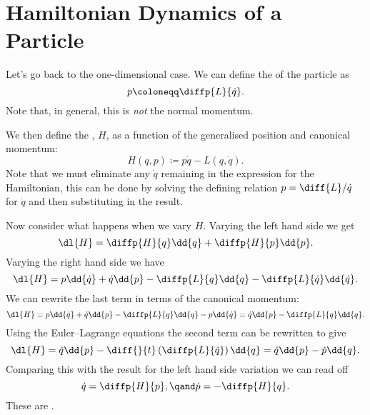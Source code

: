 \documentclass[fleqn]{NotesClass}
\newcommand{\lagrangian}{L}
\begin{document}
    \section{Hamiltonian Dynamics of a Particle}
    Let's go back to the one-dimensional case.
    We can define the  of the particle as
    \begin{equation}
        p \coloneqq \diffp{\lagrangian}{\dot{q}}.
    \end{equation}
    Note that, in general, this is \emph{not} the normal momentum.
    
    We then define the , \(H\), as a function of the generalised position and canonical momentum:
    \begin{equation}
        H(q, p) \coloneqq p\dot{q} - \lagrangian(q, \dot{q}).
    \end{equation}
    Note that we must eliminate any \(\dot{q}\) remaining in the expression for the Hamiltonian, this can be done by solving the defining relation \(p = \diff{\lagrangian}/{\dot{q}}\) for \(\dot{q}\) and then substituting in the result.
    
    Now consider what happens when we vary \(H\).
    Varying the left hand side we get
    \begin{equation}
        \dl{H} = \diffp{H}{q} \dd{q} + \diffp{H}{p} \dd{p}.
    \end{equation}
    Varying the right hand side we have
    \begin{equation}
        \dl{H} = p \dd{\dot{q}} + \dot{q} \dd{p} - \diffp{\lagrangian}{q} \dd{q} - \diffp{\lagrangian}{\dot{q}} \dd{\dot{q}}.
    \end{equation}
    We can rewrite the last term in terms of the canonical momentum:
    \begin{equation}
        \dl{H} = p \dd{\dot{q}} + \dot{q} \dd{p} - \diffp{\lagrangian}{q} \dd{q} - p \dd{\dot{q}} =  \dot{q} \dd{p} - \diffp{\lagrangian}{q} \dd{q}.
    \end{equation}
    Using the Euler--Lagrange equations the second term can be rewritten to give
    \begin{equation}
        \dl{H} =  \dot{q} \dd{p} - \diff{}{t}\left( \diffp{\lagrangian}{\dot{q}} \right) \dd{q} = \dot{q} \dd{p} - \dot{p} \dd{q}.
    \end{equation}
    Comparing this with the result for the left hand side variation we can read off
    \begin{equation}
        \dot{q} = \diffp{H}{p}, \qand \dot{p} = - \diffp{H}{q}.
    \end{equation}
    These are .
    
\end{document}
